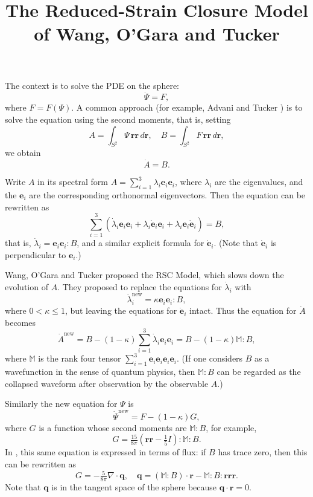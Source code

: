 \documentclass{amsart}
\title{The Reduced-Strain Closure Model of Wang, O'Gara and Tucker}
\newcommand{\p}{{\boldsymbol r}}
\newcommand{\q}{{\boldsymbol q}}
\newcommand{\e}{{\boldsymbol e}}
\begin{document}
\maketitle

\noindent
The context is to solve the PDE on the sphere:
$$ \dot \Psi = F ,$$
where $F = F(\Psi)$.  A common approach (for example, Advani and Tucker \cite{advani}) is to solve the equation using the second moments, that is, setting
$$ A = \int_{S^2} \Psi \,\p \p \, d\p ,\quad B = \int_{S^2} F \,\p \p \, d\p ,$$
we obtain
$$ \dot A = B .$$

Write $A$ in its spectral form $A = \sum_{i=1}^3 \lambda_i \e_i \e_i$, where $\lambda_i$ are the eigenvalues, and the $\e_i$ are the corresponding orthonormal eigenvectors.  Then the equation can be rewritten as
$$ \sum_{i=1}^3 (\dot\lambda_i \e_i\e_i + \lambda_i \dot\e_i\e_i + \lambda_i \e_i\dot\e_i) = B ,$$
that is, $\dot\lambda_i = \e_i \e_i: B$, and a similar explicit formula for $\dot\e_i$.  (Note that $\dot\e_i$ is perpendicular to $\e_i$.)

Wang, O'Gara and Tucker \cite{rsc} proposed the RSC Model, which slows down the evolution of $A$.  They proposed to replace the equations for $\dot\lambda_i$ with
$$ \dot\lambda^\text{new}_i = \kappa \e_i \e_i: B, $$
where $0<\kappa\le 1$, but leaving the equations for $\dot\e_i$ intact.  Thus the equation for $\dot A$ becomes
$$ \dot A^\text{new} = B - (1-\kappa) \sum_{i=1}^3 \dot\lambda_i \e_i\e_i = B - (1-\kappa)\mathbb M:B, $$
where $\mathbb M$ is the rank four tensor $\sum_{i=1}^3 \e_i\e_i\e_i\e_i$.  (If one considers $B$ as a wavefunction in the sense of quantum physics, then $\mathbb M : B$ can be regarded as the collapsed waveform after observation by the observable $A$.)

Similarly the new equation for $\Psi$ is
$$ \dot\Psi^\text{new} = F - (1-\kappa)G,$$
where $G$ is a function whose second moments are $\mathbb M: B$, for example,
$$ G = \tfrac{15}{8\pi}(\p\p-\tfrac15 I):\mathbb M: B .$$
In \cite{rsc}, this same equation is expressed in terms of flux: if $B$ has trace zero, then this can be rewritten as
$$ G = -\tfrac{5}{8\pi}\nabla\cdot \q, \quad \q = (\mathbb M:B)\cdot\p-\mathbb M:B:\p\p\p .$$
Note that $\q$ is in the tangent space of the sphere because $\q\cdot\p = 0$.
\end{document}
